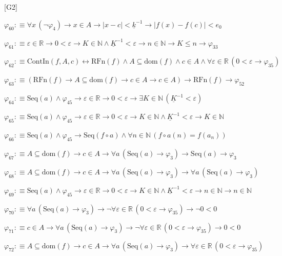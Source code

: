 \begin{fullproof}{[G2]}
\begin{abbrevlist}
\item $\varphi_{60} :\equiv \forall x\,(\neg \varphi_{4}) \to x \in A \to \lvert x - c \rvert < \underline{k}^{-1} \to \lvert f(x) - f(c) \rvert < e_{0}$
\item $\varphi_{61} :\equiv \varepsilon \in \mathbb{R} \to 0 < \varepsilon \to K \in \mathbb{N} \land \underline{K}^{-1} < \varepsilon \to n \in \mathbb{N} \to K \leq n \to \varphi_{33}$
\item $\varphi_{62} :\equiv \mathrm{ContIn}(f,A,c) \leftrightarrow \mathrm{RFn}(f) \land A \subseteq \mathrm{dom}(f) \land c \in A \land \forall \varepsilon \in \mathbb{R}\,(0 < \varepsilon \to \varphi_{35})$
\item $\varphi_{63} :\equiv (\mathrm{RFn}(f) \to A \subseteq \mathrm{dom}(f) \to c \in A \to c \in A) \to \mathrm{RFn}(f) \to \varphi_{52}$
\item $\varphi_{64} :\equiv \mathrm{Seq}(a) \land \varphi_{45} \to \varepsilon \in \mathbb{R} \to 0 < \varepsilon \to \exists K \in \mathbb{N}\,(\underline{K}^{-1} < \varepsilon)$
\item $\varphi_{65} :\equiv \mathrm{Seq}(a) \land \varphi_{45} \to \varepsilon \in \mathbb{R} \to 0 < \varepsilon \to K \in \mathbb{N} \land \underline{K}^{-1} < \varepsilon \to K \in \mathbb{N}$
\item $\varphi_{66} :\equiv \mathrm{Seq}(a) \land \varphi_{45} \to \mathrm{Seq}(f \circ a) \land \forall n \in \mathbb{N}\,(f \circ a(n) = f(a_{n}))$
\item $\varphi_{67} :\equiv A \subseteq \mathrm{dom}(f) \to c \in A \to \forall a\,(\mathrm{Seq}(a) \to \varphi_{3}) \to \mathrm{Seq}(a) \to \varphi_{3}$
\item $\varphi_{68} :\equiv A \subseteq \mathrm{dom}(f) \to c \in A \to \forall a\,(\mathrm{Seq}(a) \to \varphi_{3}) \to \forall a\,(\mathrm{Seq}(a) \to \varphi_{3})$
\item $\varphi_{69} :\equiv \mathrm{Seq}(a) \land \varphi_{45} \to \varepsilon \in \mathbb{R} \to 0 < \varepsilon \to K \in \mathbb{N} \land \underline{K}^{-1} < \varepsilon \to n \in \mathbb{N} \to n \in \mathbb{N}$
\item $\varphi_{70} :\equiv \forall a\,(\mathrm{Seq}(a) \to \varphi_{3}) \to \neg \forall \varepsilon \in \mathbb{R}\,(0 < \varepsilon \to \varphi_{35}) \to \neg 0 < 0$
\item $\varphi_{71} :\equiv c \in A \to \forall a\,(\mathrm{Seq}(a) \to \varphi_{3}) \to \neg \forall \varepsilon \in \mathbb{R}\,(0 < \varepsilon \to \varphi_{35}) \to 0 < 0$
\item $\varphi_{72} :\equiv A \subseteq \mathrm{dom}(f) \to c \in A \to \forall a\,(\mathrm{Seq}(a) \to \varphi_{3}) \to \forall \varepsilon \in \mathbb{R}\,(0 < \varepsilon \to \varphi_{35})$

\end{abbrevlist}
\end{fullproof}
